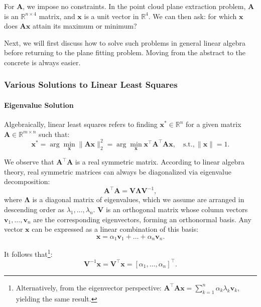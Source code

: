 For $\mathbf{A}$, we impose no constraints. In the point cloud plane extraction problem, $\mathbf{A}$ is an $\mathbb{R}^{n \times 4}$ matrix, and $\mathbf{x}$ is a unit vector in $\mathbb{R}^4$. We can then ask: for which $\mathbf{x}$ does $\mathbf{A}\mathbf{x}$ attain its maximum or minimum?

Next, we will first discuss how to solve such problems in general linear algebra before returning to the plane fitting problem. Moving from the abstract to the concrete is always easier.

\subsubsection{Various Solutions to Linear Least Squares}
\paragraph{Eigenvalue Solution}
Algebraically, linear least squares refers to finding $\mathbf{x}^* \in \mathbb{R}^n$ for a given matrix $\mathbf{A} \in \mathbb{R}^{m \times n}$ such that:
\begin{equation}\label{key}
	\mathbf{x}^* = \arg \min_{\mathbf{x}} \|\mathbf{A} \mathbf{x} \|^2_2 =  \arg \min_{\mathbf{x}} \mathbf{x}^\top \mathbf{A}^\top 
	\mathbf{A} \mathbf{x}, \quad \text{s.t.}, \| \mathbf{x} \| = 1.
\end{equation}

We observe that $\mathbf{A}^\top \mathbf{A}$ is a real symmetric matrix. According to linear algebra theory, real symmetric matrices can always be diagonalized via eigenvalue decomposition:
\begin{equation}\label{key}
	\mathbf{A}^\top \mathbf{A} = \mathbf{V} \boldsymbol{\Lambda} \mathbf{V}^{-1},
\end{equation}
where $\boldsymbol{\Lambda}$ is a diagonal matrix of eigenvalues, which we assume are arranged in descending order as $\lambda_1, \ldots, \lambda_n$. $\mathbf{V}$ is an orthogonal matrix whose column vectors $\mathbf{v}_1, \ldots, \mathbf{v}_n$ are the corresponding eigenvectors, forming an orthonormal basis. Any vector $\mathbf{x}$ can be expressed as a linear combination of this basis:
\begin{equation}\label{key}
	\mathbf{x} = \alpha_1 \mathbf{v}_1 + \ldots + \alpha_n \mathbf{v}_n.
\end{equation}

It follows that\footnote{Alternatively, from the eigenvector perspective: $\mathbf{A}^\top \mathbf{A} \mathbf{x} = \sum_{k=1}^{n} \alpha_k \lambda_k \mathbf{v}_k$, yielding the same result.}:
\begin{equation}\label{key}
	\mathbf{V}^{-1} \mathbf{x} = \mathbf{V}^\top \mathbf{x} = [\alpha_1, \ldots, \alpha_n]^\top. 
\end{equation}

